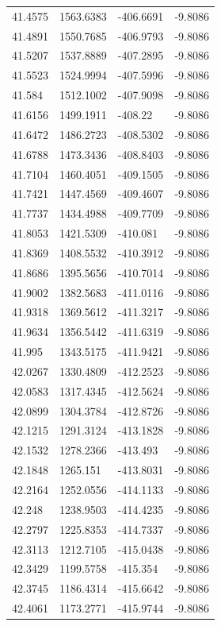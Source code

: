 \begin{table}[H]
\begin{tabular}{llll}
41.4575 & 1563.6383 & -406.6691 & -9.8086 \\
41.4891 & 1550.7685 & -406.9793 & -9.8086 \\
41.5207 & 1537.8889 & -407.2895 & -9.8086 \\
41.5523 & 1524.9994 & -407.5996 & -9.8086 \\
41.584 & 1512.1002 & -407.9098 & -9.8086 \\
41.6156 & 1499.1911 & -408.22 & -9.8086 \\
41.6472 & 1486.2723 & -408.5302 & -9.8086 \\
41.6788 & 1473.3436 & -408.8403 & -9.8086 \\
41.7104 & 1460.4051 & -409.1505 & -9.8086 \\
41.7421 & 1447.4569 & -409.4607 & -9.8086 \\
41.7737 & 1434.4988 & -409.7709 & -9.8086 \\
41.8053 & 1421.5309 & -410.081 & -9.8086 \\
41.8369 & 1408.5532 & -410.3912 & -9.8086 \\
41.8686 & 1395.5656 & -410.7014 & -9.8086 \\
41.9002 & 1382.5683 & -411.0116 & -9.8086 \\
41.9318 & 1369.5612 & -411.3217 & -9.8086 \\
41.9634 & 1356.5442 & -411.6319 & -9.8086 \\
41.995 & 1343.5175 & -411.9421 & -9.8086 \\
42.0267 & 1330.4809 & -412.2523 & -9.8086 \\
42.0583 & 1317.4345 & -412.5624 & -9.8086 \\
42.0899 & 1304.3784 & -412.8726 & -9.8086 \\
42.1215 & 1291.3124 & -413.1828 & -9.8086 \\
42.1532 & 1278.2366 & -413.493 & -9.8086 \\
42.1848 & 1265.151 & -413.8031 & -9.8086 \\
42.2164 & 1252.0556 & -414.1133 & -9.8086 \\
42.248 & 1238.9503 & -414.4235 & -9.8086 \\
42.2797 & 1225.8353 & -414.7337 & -9.8086 \\
42.3113 & 1212.7105 & -415.0438 & -9.8086 \\
42.3429 & 1199.5758 & -415.354 & -9.8086 \\
42.3745 & 1186.4314 & -415.6642 & -9.8086 \\
42.4061 & 1173.2771 & -415.9744 & -9.8086 \\

\end{tabular}
\end{table}
